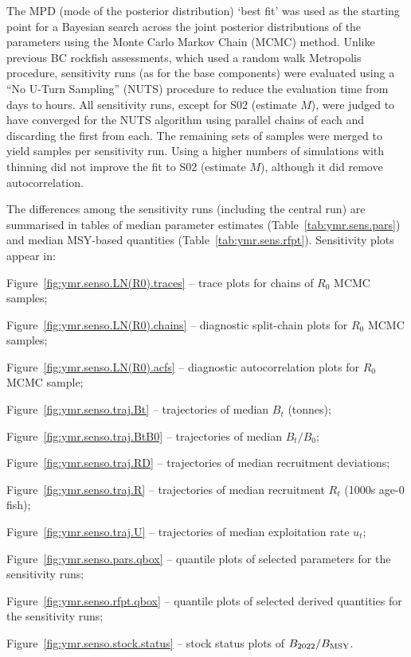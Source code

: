 \documentclass[11pt]{book}
\newcommand{\Bmsy}{B_\text{MSY}}
\begin{document}
The MPD (mode of the posterior distribution) `best fit' was used as the starting point for a Bayesian search across the joint posterior distributions of the parameters using the Monte Carlo Markov Chain (MCMC) method.
Unlike previous BC rockfish assessments, which used a random walk Metropolis procedure, sensitivity runs (as for the base components) were evaluated using a ``No U-Turn Sampling'' (NUTS) procedure to reduce the evaluation time from days to hours.
All sensitivity runs, except for S02 (estimate $M$), were judged to have converged for the NUTS algorithm using \nChains{} parallel chains of \cSims{} each and discarding the first \cBurn{} from each. 
The remaining \nChains{} sets of \cSamps{} samples were merged to yield \Nmcmc{} samples per sensitivity run.
Using a higher numbers of simulations with thinning did not improve the fit to S02 (estimate $M$), although it did remove autocorrelation.

The differences among the sensitivity runs (including the central run) are summarised in tables of median parameter estimates (Table~\ref{tab:ymr.sens.pars}) and median MSY-based quantities (Table~\ref{tab:ymr.sens.rfpt}).
Sensitivity plots appear in:
\begin{itemize_csas}{}{}
  \item Figure~\ref{fig:ymr.senso.LN(R0).traces} -- trace plots for chains of $R_0$ MCMC samples;
  \item Figure~\ref{fig:ymr.senso.LN(R0).chains} -- diagnostic split-chain plots for $R_0$ MCMC samples;
  \item Figure~\ref{fig:ymr.senso.LN(R0).acfs} -- diagnostic autocorrelation plots for $R_0$ MCMC sample;
  \item Figure~\ref{fig:ymr.senso.traj.Bt} -- trajectories of median $B_t$ (tonnes);
  \item Figure~\ref{fig:ymr.senso.traj.BtB0} -- trajectories of median $B_t/B_0$;
  \item Figure~\ref{fig:ymr.senso.traj.RD} -- trajectories of median recruitment deviations;
  \item Figure~\ref{fig:ymr.senso.traj.R} -- trajectories of median recruitment $R_t$ (1000s age-0 fish);
  \item Figure~\ref{fig:ymr.senso.traj.U} -- trajectories of median exploitation rate $u_t$;
  \item Figure~\ref{fig:ymr.senso.pars.qbox} -- quantile plots of selected parameters for the sensitivity runs;
  \item Figure~\ref{fig:ymr.senso.rfpt.qbox} -- quantile plots of selected derived quantities for the sensitivity runs;
  \item Figure~\ref{fig:ymr.senso.stock.status} -- stock status plots of $B_{\currYear}/\Bmsy$.
 \end{itemize_csas}
\end{document}
